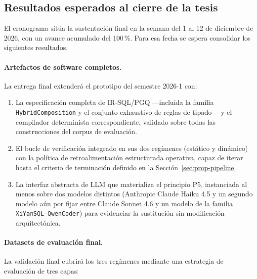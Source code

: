 \subsection{Resultados esperados al cierre de la tesis}
\label{subsec:prop-resultados-final}

El cronograma sitúa la sustentación final en la semana del 1 al 12 de diciembre de 2026, con un avance acumulado del 100\,\%. Para esa fecha se espera consolidar los siguientes resultados.

\paragraph{Artefactos de software completos.} La entrega final extenderá el prototipo del semestre 2026-1 con:

\begin{enumerate}
    \item La especificación completa de IR-SQL/PGQ ---incluida la familia \texttt{HybridComposition} y el conjunto exhaustivo de reglas de tipado--- y el compilador determinista correspondiente, validado sobre todas las construcciones del corpus de evaluación.
    \item El bucle de verificación integrado en sus dos regímenes (estático y dinámico) con la política de retroalimentación estructurada operativa, capaz de iterar hasta el criterio de terminación definido en la Sección~\ref{sec:prop-pipeline}.
    \item La interfaz abstracta de \ac{LLM} que materializa el principio P5, instanciada al menos sobre dos modelos distintos (Anthropic Claude Haiku 4.5 y un segundo modelo aún por fijar entre Claude Sonnet 4.6 y un modelo de la familia \texttt{XiYanSQL-QwenCoder}) para evidenciar la sustitución sin modificación arquitectónica. %
\end{enumerate}

\paragraph{Datasets de evaluación final.} La validación final cubrirá los tres regímenes mediante una estrategia de evaluación de tres capas:

